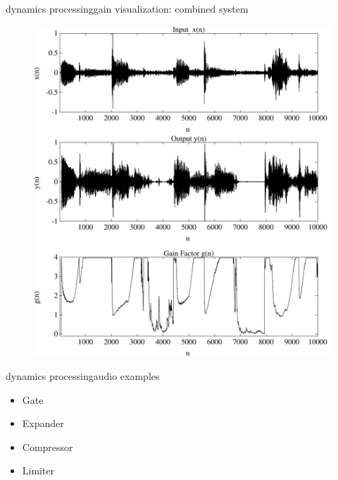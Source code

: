 \begin{frame}{dynamics processing}{gain visualization: combined system}
	\vspace{-3mm}\begin{figure}
		\centering
			\includegraphics[scale=.25]{graph/dynamics_gain}
	\end{figure}
\end{frame}

\begin{frame}{dynamics processing}{audio examples}
    \bigskip
    \begin{itemize}
        \item Gate 
        \item Expander 
        \item Compressor 
        \item Limiter 
    \end{itemize}
\end{frame}

